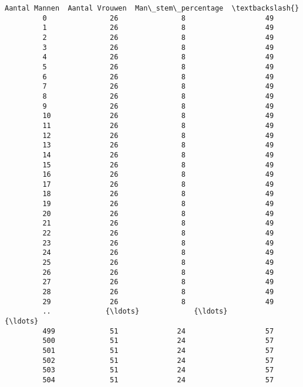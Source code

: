 \documentclass{article}
\begin{document}
\begin{Verbatim}[commandchars=\\\{\}]
              Aantal Mannen  Aantal Vrouwen  Man\_stem\_percentage  \textbackslash{}
         0               26               8                   49   
         1               26               8                   49   
         2               26               8                   49   
         3               26               8                   49   
         4               26               8                   49   
         5               26               8                   49   
         6               26               8                   49   
         7               26               8                   49   
         8               26               8                   49   
         9               26               8                   49   
         10              26               8                   49   
         11              26               8                   49   
         12              26               8                   49   
         13              26               8                   49   
         14              26               8                   49   
         15              26               8                   49   
         16              26               8                   49   
         17              26               8                   49   
         18              26               8                   49   
         19              26               8                   49   
         20              26               8                   49   
         21              26               8                   49   
         22              26               8                   49   
         23              26               8                   49   
         24              26               8                   49   
         25              26               8                   49   
         26              26               8                   49   
         27              26               8                   49   
         28              26               8                   49   
         29              26               8                   49   
         ..             {\ldots}             {\ldots}                  {\ldots}   
         499             51              24                   57   
         500             51              24                   57   
         501             51              24                   57   
         502             51              24                   57   
         503             51              24                   57   
         504             51              24                   57   

\end{Verbatim}
\end{document}
